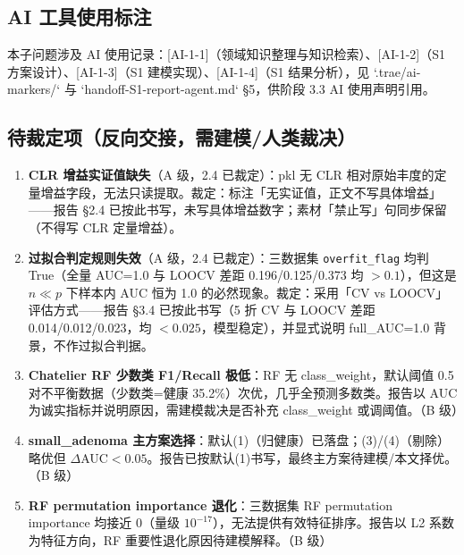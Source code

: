 \documentclass{article}
\begin{document}
\subsection{AI 工具使用标注}

本子问题涉及 AI 使用记录：[AI-1-1]（领域知识整理与知识检索）、[AI-1-2]（S1 方案设计）、[AI-1-3]（S1 建模实现）、[AI-1-4]（S1 结果分析），见 `.trae/ai-markers/` 与 `handoff-S1-report-agent.md` §5，供阶段 3.3 AI 使用声明引用。

\subsection{待裁定项（反向交接，需建模/人类裁决）}

\begin{enumerate}
  \item \textbf{CLR 增益实证值缺失}（A 级，2.4 已裁定）：pkl 无 CLR 相对原始丰度的定量增益字段，无法只读提取。裁定：标注「无实证值，正文不写具体增益」——报告 §2.4 已按此书写，未写具体增益数字；素材「禁止写」句同步保留（不得写 CLR 定量增益）。
  \item \textbf{过拟合判定规则失效}（A 级，2.4 已裁定）：三数据集 \texttt{overfit\_flag} 均判 True（全量 AUC=1.0 与 LOOCV 差距 0.196/0.125/0.373 均 $>0.1$），但这是 $n\ll p$ 下样本内 AUC 恒为 1.0 的必然现象。裁定：采用「CV vs LOOCV」评估方式——报告 §3.4 已按此书写（5 折 CV 与 LOOCV 差距 0.014/0.012/0.023，均 $<0.025$，模型稳定），并显式说明 full\_AUC=1.0 背景，不作过拟合判据。
  \item \textbf{Chatelier RF 少数类 F1/Recall 极低}：RF 无 class\_weight，默认阈值 0.5 对不平衡数据（少数类=健康 35.2\%）次优，几乎全预测多数类。报告以 AUC 为诚实指标并说明原因，需建模裁决是否补充 class\_weight 或调阈值。（B 级）
  \item \textbf{small\_adenoma 主方案选择}：默认(1)（归健康）已落盘；(3)/(4)（剔除）略优但 $\Delta$AUC$<0.05$。报告已按默认(1)书写，最终主方案待建模/本文择优。（B 级）
  \item \textbf{RF permutation importance 退化}：三数据集 RF permutation importance 均接近 0（量级 $10^{-17}$），无法提供有效特征排序。报告以 L2 系数为特征方向，RF 重要性退化原因待建模解释。（B 级）
\end{enumerate}
\end{document}
